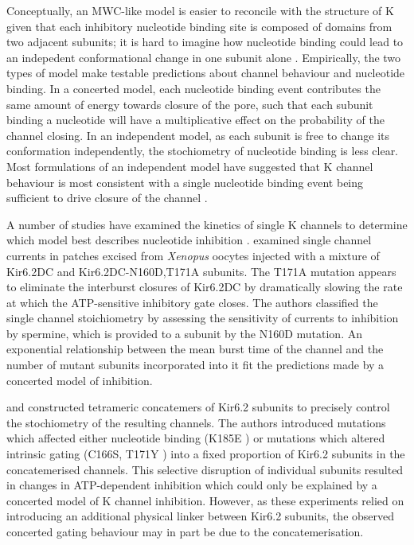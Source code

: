 Conceptually, an MWC-like model is easier to reconcile with the structure of K\ATP{} given that each inhibitory nucleotide binding site is composed of domains from two adjacent subunits; it is hard to imagine how nucleotide binding could lead to an indepedent conformational change in one subunit alone \cite{craig_how_2008-1}.
Empirically, the two types of model make testable predictions about channel behaviour and nucleotide binding.
In a concerted model, each nucleotide binding event contributes the same amount of energy towards closure of the pore, such that each subunit binding a nucleotide will have a multiplicative effect on the probability of the channel closing.
In an independent model, as each subunit is free to change its conformation independently, the stochiometry of nucleotide binding is less clear.
Most formulations of an independent model have suggested that K\ATP{} channel behaviour is most consistent with a single nucleotide binding event being sufficient to drive closure of the channel \cite{trapp_molecular_1998, markworth_atp4-_2000, li_open_2002, fang_n-terminal_2006-1}.

A number of studies have examined the kinetics of single K\ATP{} channels to determine which model best describes nucleotide inhibition \cite{drain_concerted_2004, fang_n-terminal_2006-1, wang_subunit-stoichiometric_2007, craig_how_2008-1}.
\textcite{drain_concerted_2004} examined single channel currents in patches excised from \textit{Xenopus} oocytes injected with a mixture of Kir6.2\textgreek{D}C and Kir6.2\textgreek{D}C-N160D,T171A subunits.
The T171A mutation appears to eliminate the interburst closures of Kir6.2\textgreek{D}C by dramatically slowing the rate at which the ATP-sensitive inhibitory gate closes.
The authors classified the single channel stoichiometry by assessing the sensitivity of currents to inhibition by spermine, which is provided to a subunit by the N160D mutation.
An exponential relationship between the mean burst time of the channel and the number of mutant subunits incorporated into it fit the predictions made by a concerted model of inhibition.

\textcite{wang_subunit-stoichiometric_2007} and \textcite{craig_how_2008-1} constructed tetrameric concatemers of Kir6.2 subunits to precisely control the stochiometry of the resulting channels.
The authors introduced mutations which affected either nucleotide binding (K185E \cite{wang_subunit-stoichiometric_2007, craig_how_2008-1}) or mutations which altered intrinsic gating (C166S, T171Y \cite{wang_subunit-stoichiometric_2007}) into a fixed proportion of Kir6.2 subunits in the concatemerised channels.
This selective disruption of individual subunits resulted in changes in ATP-dependent inhibition which could only be explained by a concerted model of K\ATP{} channel inhibition.
However, as these experiments relied on introducing an additional physical linker between Kir6.2 subunits, the observed concerted gating behaviour may in part be due to the concatemerisation.

